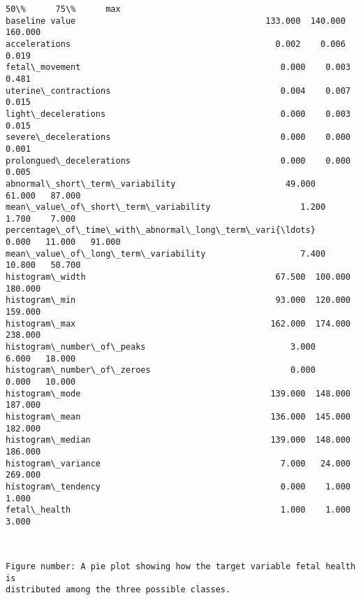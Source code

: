 \documentclass[11pt]{article}
\begin{document}
\begin{tcolorbox}[breakable, size=fbox, boxrule=.5pt, pad at break*=1mm, opacityfill=0]
\begin{Verbatim}[commandchars=\\\{\}]
                                                        50\%      75\%      max
baseline value                                      133.000  140.000  160.000
accelerations                                         0.002    0.006    0.019
fetal\_movement                                        0.000    0.003    0.481
uterine\_contractions                                  0.004    0.007    0.015
light\_decelerations                                   0.000    0.003    0.015
severe\_decelerations                                  0.000    0.000    0.001
prolongued\_decelerations                              0.000    0.000    0.005
abnormal\_short\_term\_variability                      49.000   61.000   87.000
mean\_value\_of\_short\_term\_variability                  1.200    1.700    7.000
percentage\_of\_time\_with\_abnormal\_long\_term\_vari{\ldots}    0.000   11.000   91.000
mean\_value\_of\_long\_term\_variability                   7.400   10.800   50.700
histogram\_width                                      67.500  100.000  180.000
histogram\_min                                        93.000  120.000  159.000
histogram\_max                                       162.000  174.000  238.000
histogram\_number\_of\_peaks                             3.000    6.000   18.000
histogram\_number\_of\_zeroes                            0.000    0.000   10.000
histogram\_mode                                      139.000  148.000  187.000
histogram\_mean                                      136.000  145.000  182.000
histogram\_median                                    139.000  148.000  186.000
histogram\_variance                                    7.000   24.000  269.000
histogram\_tendency                                    0.000    1.000    1.000
fetal\_health                                          1.000    1.000    3.000
\end{Verbatim}
\end{tcolorbox}

    \begin{center}
    \end{center}
    { \hspace*{\fill} \\}
    
    \begin{Verbatim}[commandchars=\\\{\}]
Figure number: A pie plot showing how the target variable fetal health is
distributed among the three possible classes.
    \end{Verbatim}
\end{document}
